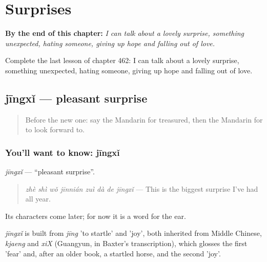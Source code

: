 
\chapter{Surprises}
\label{ch:zh-surprises}

\begin{chapteropening}
\textbf{By the end of this chapter:} \emph{I can talk about a lovely surprise, something unexpected, hating someone, giving up hope and falling out of love.}

Complete the last lesson of chapter 462: I can talk about a lovely surprise, something unexpected, hating someone, giving up hope and falling out of love.
\end{chapteropening}

\section[jīngxǐ]{jīngxǐ — pleasant surprise}

\label{lesson:ZH-C462-jingxi}



\begin{quote}
Before the new one: say the Mandarin for treasured, then the Mandarin for to look forward to.
\end{quote}

\subsection*{You'll want to know: jīngxǐ}
\emph{jīngxǐ} — \textquotedblleft{}pleasant surprise\textquotedblright{}.

\begin{quote}
\emph{zhè shì wǒ jīnnián zuì dà de jīngxǐ} — This is the biggest surprise I've had all year.
\end{quote}

Its characters come later; for now it is a word for the ear.

\begin{cousinweb}
\emph{jīngxǐ} is built from \emph{jīng} 'to startle' and  'joy', both inherited from Middle Chinese, \emph{kjaeng} and \emph{xiX} (Guangyun, in Baxter's transcription), which glosses the first 'fear' and, after an older book, a startled horse, and the second 'joy'.
\end{cousinweb}

